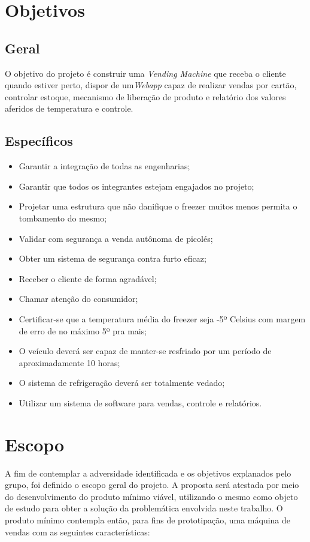 \section{Objetivos}

\subsection{Geral}

O objetivo do projeto é construir uma \textit{Vending Machine} que receba o cliente quando estiver perto, dispor de um\textit{Webapp} capaz de realizar vendas por cartão, controlar estoque, mecanismo de liberação de produto e relatório dos valores aferidos de temperatura e controle.  

\subsection{Específicos}

\begin{itemize}
\item Garantir a integração de todas as engenharias;
\item Garantir que todos os integrantes estejam engajados no projeto;
\item Projetar uma estrutura que não danifique o freezer muitos menos permita o tombamento do mesmo;
\item Validar com segurança a venda autônoma de picolés;
\item Obter um sistema de segurança contra furto eficaz;
\item Receber o cliente de forma agradável;
\item Chamar atenção do consumidor;
\item Certificar-se que a temperatura média do freezer seja -5º Celsius com margem de erro de no máximo 5º pra mais;
\item O veículo deverá ser capaz de manter-se resfriado por um período de aproximadamente 10 horas;
\item O sistema de refrigeração deverá ser totalmente vedado;
\item Utilizar um sistema de software para vendas, controle e relatórios.
\end{itemize}


\section{Escopo}
A fim de contemplar a adversidade identificada e os objetivos explanados pelo grupo, foi definido o escopo geral do projeto. A proposta será atestada por meio do desenvolvimento do produto mínimo viável, utilizando o mesmo como objeto de estudo para obter a solução da problemática envolvida neste trabalho. O produto mínimo contempla então, para fins de prototipação, uma máquina de vendas com as seguintes características:

